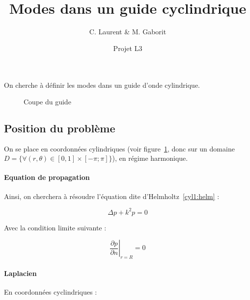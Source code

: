 \documentclass[11pt]{article}
\title{Modes dans un guide cyclindrique}
\author{C. Laurent \& M. Gaborit}
\date{Projet L3}
\begin{document}
\maketitle

On cherche à définir les modes dans un guide d'onde cylindrique.

\begin{figure}
    \centering
{}
\caption{\label{cyl1:fig} Coupe du guide}
\end{figure}

\subsection*{Position du problème}

On se place en coordonnées cylindriques (voir figure~\ref{cyl1:fig}, donc sur un domaine $D =
\{\forall(r,\theta)\in[0,1]\times[-\pi;\pi]\}$), en régime harmonique.

\paragraph{Equation de propagation} Ainsi, on cherchera à résoudre l'équation dite d'Helmholtz~\eqref{cyl1:helm} :

\begin{equation}
\Delta p  + k^2p = 0 \label{cyl1:helm}
\end{equation}

Avec la condition limite suivante :

\begin{equation}
    \left.\frac{\partial p}{\partial n}\right|_{r=R} = 0\label{cyl1:CL1}
\end{equation}

\paragraph{Laplacien} En coordonnées cyclindriques :
\end{document}
